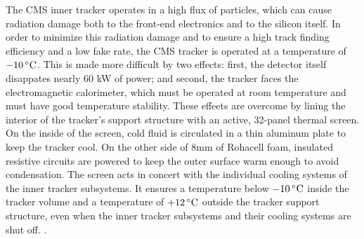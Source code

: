The CMS inner tracker operates in a high flux of particles, which
can cause radiation damage both to the front-end electronics and to 
the silicon itself.  In order to minimize this radiation damage and 
to ensure a high track finding efficiency and a low fake rate, 
the CMS tracker is operated at a temperature of $-10\,^{\circ}{\rm C}$.
This is made more difficult by two effects:  first, the detector itself
disappates nearly 60 kW of power; and second, the tracker faces the
electromagnetic calorimeter, which must be operated at room temperature and must have good temperature stability.
These effeets are overcome by lining the interior of the tracker's support structure
with an active, 32-panel thermal screen.  On the inside of the screen, cold fluid is
circulated in a thin aluminum plate to keep the tracker cool.  On the other 
side of 8mm of Rohacell foam, insulated resistive circuits are powered to keep the outer
surface warm enough to avoid condensation.  The screen acts in concert with the
individual cooling systems of the inner tracker subsystems.  It  ensures a temperature
below $-10\,^{\circ}{\rm C}$ inside the tracker volume and a temperature of 
$+12\,^{\circ}{\rm C}$ outside the tracker support structure, even when the 
inner tracker subsystems and their cooling systems are shut off.
\cite{cms-jinst,cms-tdr}.
